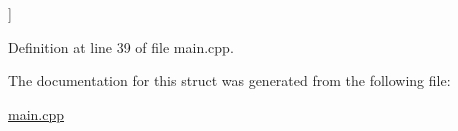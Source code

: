 \begin{Desc}
\begin{description}
{}]\item[{\em 
\hypertarget{struct_eigen_1_1internal_1_1functor__traits_3_01scalar__normal__dist__op_3_01_scalar_01_4_01_4_aa24d49756a42945135cf4bb233f70852a953ef8c87ba7a342649b4b09347c6fda}{Is\+Repeatable}\label{struct_eigen_1_1internal_1_1functor__traits_3_01scalar__normal__dist__op_3_01_scalar_01_4_01_4_aa24d49756a42945135cf4bb233f70852a953ef8c87ba7a342649b4b09347c6fda}
}]\end{description}
\end{Desc}


Definition at line 39 of file main.\+cpp.



The documentation for this struct was generated from the following file\+:\begin{DoxyCompactItemize}
\item 
\hyperlink{main_8cpp}{main.\+cpp}\end{DoxyCompactItemize}
